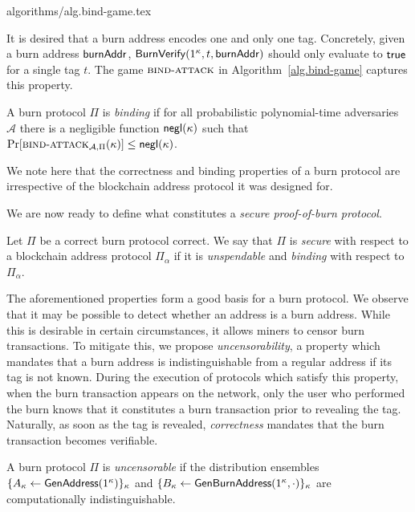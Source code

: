 {algorithms/alg.bind-game.tex}

It is desired that a burn address encodes one and only one tag. Concretely, given a burn address $\mathsf{burnAddr}$, $\mathsf{BurnVerify}(1^\kappa, t, \mathsf{burnAddr})$ should only evaluate to $\mathsf{true}$ for a single tag $t$. The game $\textsc{bind}\-\text{-}\-\textsc{attack}$ in Algorithm~\ref{alg.bind-game} captures this property.

\begin{definition}[Binding]
  A burn protocol $\Pi$ is \emph{binding} if
  for all probabilistic polynomial-time adversaries $\mathcal{A}$ there is a
  negligible function $\textsf{negl}(\kappa)$ such that
  $\Pr[\textsc{bind}\-\text{-}\-\textsc{attack}_{\mathcal{A},\Pi}(\kappa)] \leq \textsf{negl}(\kappa)$.
\end{definition}

We note here that the correctness and binding properties of a burn protocol are irrespective of the blockchain address protocol it was designed for.

We are now ready to define what constitutes a \emph{secure proof-of-burn protocol}.

\begin{definition}[Security]
  Let $\Pi$ be a correct burn protocol correct. We say that $\Pi$ is \emph{secure} with respect to a blockchain address protocol $\Pi_\alpha$ if it is \emph{unspendable} and \emph{binding} with respect to $\Pi_\alpha$.
\end{definition}

The aforementioned properties form a good basis for a burn protocol. We observe that it may be possible to detect whether an address is a burn address. While this is desirable in certain circumstances, it allows miners to censor burn transactions. To mitigate this, we propose \emph{uncensorability}, a property which mandates that a burn address is indistinguishable from a regular address if its tag is not known. During the execution of protocols which satisfy this property, when the burn transaction appears on the network, only the user who performed the burn knows that it constitutes a burn transaction prior to revealing the tag. Naturally, as soon as the tag is revealed, \emph{correctness} mandates that the burn transaction becomes verifiable.

\begin{definition}[Uncensorability]
  A burn protocol $\Pi$ is \emph{uncensorable} if
  the distribution ensembles $\{A_\kappa \gets \mathsf{GenAddress}(1^\kappa)\}_\kappa$ and
  $\{B_\kappa \gets \mathsf{Gen}\-\mathsf{Burn}\-\mathsf{Address}(1^\kappa, \cdot)\}_\kappa$ are computationally indistinguishable.
\end{definition}
